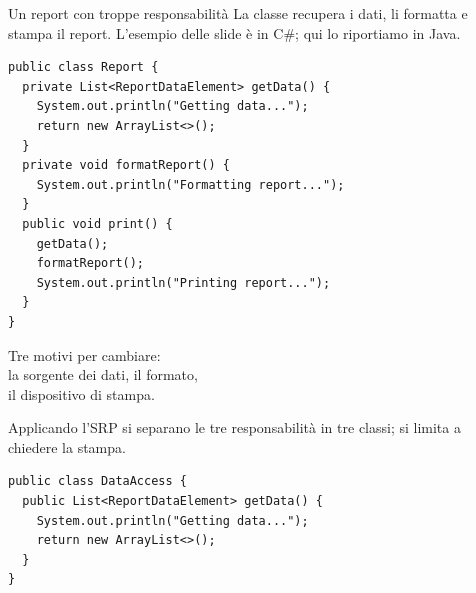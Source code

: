 \begin{esempio}{Un report con troppe responsabilità}
La classe  recupera i dati, li formatta e stampa il report. L'esempio delle slide è in C\#; qui lo riportiamo
in Java.

\noindent\begin{minipage}[c]{0.62\textwidth}
\begin{lstlisting}[style=java]
public class Report {
  private List<ReportDataElement> getData() {
    System.out.println("Getting data...");
    return new ArrayList<>();
  }
  private void formatReport() {
    System.out.println("Formatting report...");
  }
  public void print() {
    getData();
    formatReport();
    System.out.println("Printing report...");
  }
}
\end{lstlisting}
\end{minipage}\hfill
\begin{minipage}[c]{0.33\textwidth}
\centering
{}

\vspace{4pt}
{\scriptsize Tre motivi per cambiare:\\ la sorgente dei dati, il formato,\\ il dispositivo di stampa.\par}
\end{minipage}

Applicando l'SRP si separano le tre responsabilità in tre classi;  si limita a chiedere la stampa.

\begin{center}
\end{center}

\noindent\begin{minipage}[t]{0.49\textwidth}
\begin{lstlisting}[style=java]
public class DataAccess {
  public List<ReportDataElement> getData() {
    System.out.println("Getting data...");
    return new ArrayList<>();
  }
}


\end{lstlisting}
\end{minipage}
\end{esempio}
